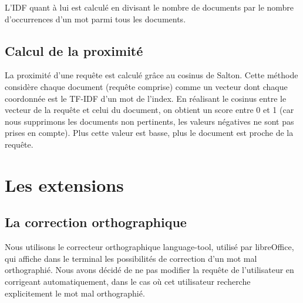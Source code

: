 \documentclass[a4paper,10pt]{article}
\begin{document}
L'IDF quant \`a lui est calcul\'e en divisant le nombre de documents par le nombre d'occurrences d'un mot parmi tous les documents.

\subsection{Calcul de la proximit\'e}

La proximit\'e d'une requ\^ete est calcul\'e gr\^ace au cosinus de Salton. Cette m\'ethode consid\`ere chaque document (requ\^ete comprise) comme un vecteur dont chaque coordonn\'ee est le TF-IDF d'un mot de l'index. En r\'ealisant le cosinus entre le vecteur de la requ\^ete et celui du document, on obtient un score entre 0 et 1 (car nous supprimons les documents non pertinents, les valeurs n\'egatives ne sont pas prises en compte). Plus cette valeur est basse, plus le document est proche de la requ\^ete.

\section{Les extensions}

\subsection{La correction orthographique}

Nous utilisons le correcteur orthographique language-tool, utilis\'e par libreOffice, qui affiche dans le terminal les possibilit\'es de correction d'un mot mal orthographi\'e. Nous avons d\'ecid\'e de ne pas modifier la requ\^ete de l'utilisateur en corrigeant automatiquement, dans le cas o\`u cet utilisateur recherche explicitement le mot mal orthographi\'e.
\end{document}
